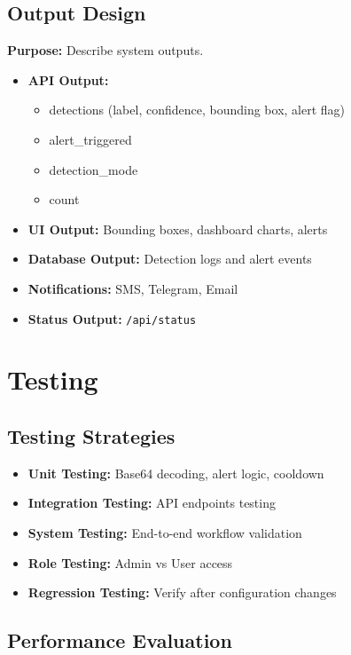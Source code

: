\documentclass[10pt,openany]{report}
\begin{document}
\begin{sloppypar}
{{{\begin{sloppypar}
\subsection{Output Design}
\textbf{Purpose:} Describe system outputs.

\begin{itemize}
    \item \textbf{API Output:}
    \begin{itemize}
        \item detections (label, confidence, bounding box, alert flag)
        \item alert\_triggered
        \item detection\_mode
        \item count
    \end{itemize}
    \item \textbf{UI Output:} Bounding boxes, dashboard charts, alerts
    \item \textbf{Database Output:} Detection logs and alert events
    \item \textbf{Notifications:} SMS, Telegram, Email
    \item \textbf{Status Output:} \texttt{/api/status}
\end{itemize}

\section{Testing}

\subsection{Testing Strategies}

\begin{itemize}
    \item \textbf{Unit Testing:} Base64 decoding, alert logic, cooldown
    \item \textbf{Integration Testing:} API endpoints testing
    \item \textbf{System Testing:} End-to-end workflow validation
    \item \textbf{Role Testing:} Admin vs User access
    \item \textbf{Regression Testing:} Verify after configuration changes
\end{itemize}

\subsection{Performance Evaluation}


\end{sloppypar}}}}
\end{sloppypar}
\end{document}
